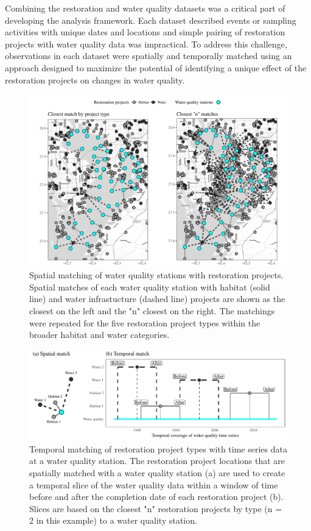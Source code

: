 \documentclass[]{article}
\begin{document}
Combining the restoration and water quality datasets was a critical part
of developing the analysis framework. Each dataset described events or
sampling activities with unique dates and locations and simple pairing
of restoration projects with water quality data was impractical. To
address this challenge, observations in each dataset were spatially and
temporally matched using an approach designed to maximize the potential
of identifying a unique effect of the restoration projects on changes in
water quality.

\begin{figure}
\includegraphics[width=\textwidth]{figs/spmtch-1} \caption{Spatial matching of water quality stations with restoration projects. Spatial matches of each water quality station with habitat (solid line) and water infrastucture (dashed line) projects are shown as the closest on the left and the "n" closest on the right.  The matchings were repeated for the five restoration project types within the broader habitat and water categories.}\label{fig:spmtch}
\end{figure}

\begin{figure}
\includegraphics[width=\textwidth]{figs/tmmtch-1} \caption{Temporal matching of restoration project types with time series data at a water quality station.  The restoration project locations that are spatially matched with a water quality station (a) are used to create a temporal slice of the water quality data within a window of time before and after the completion date of each restoration project (b).  Slices are based on the closest "n" restoration projects by type (n = 2 in this example) to a water quality station.}\label{fig:tmmtch}
\end{figure}
\end{document}
